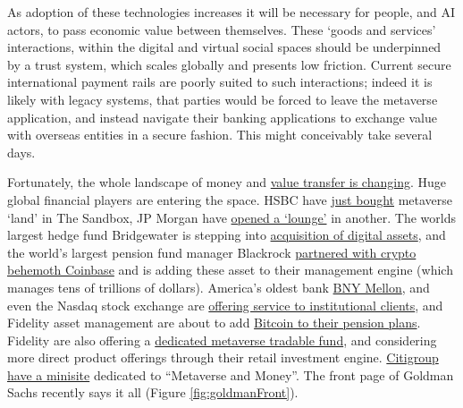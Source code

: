 As adoption of these technologies increases it will be necessary for people, and AI actors, to pass economic value between themselves. These `goods and services' interactions, within the digital and virtual social spaces should be underpinned by a trust system, which scales globally and presents low friction. Current secure international payment rails are poorly suited to such interactions; indeed it is likely with legacy systems, that parties would be forced to leave the metaverse application, and instead navigate their banking applications to exchange value with overseas entities in a secure fashion. This might conceivably take several days.\par 
Fortunately, the whole landscape of money and \href{https://www.omfif.org/futureofpayments2021/}{value transfer is changing}. Huge global financial players are entering the space. HSBC have \href{https://sandboxgame.medium.com/hsbc-to-become-the-first-global-financial-services-provider-to-enter-the-sandbox-c066e4f48163}{just bought} metaverse `land' in The Sandbox, JP Morgan have \href{https://www.forbes.com/sites/ronshevlin/2022/02/16/jpmorgan-opens-a-bank-branch-in-the-metaverse-but-its-not-for-what-you-think-its-for/?sh=2fbd1e90158d}{opened a `lounge'} in another. The worlds largest hedge fund Bridgewater is stepping into \href{https://uk.finance.yahoo.com/news/bitcoin-latest-price-crypto-ray-dalio-bridgewater-investment-fund-ethereum-094946686.html}{acquisition of digital assets}, and the world's largest pension fund manager Blackrock \href{https://blog.coinbase.com/coinbase-selected-by-blackrock-provide-aladdin-clients-access-to-crypto-trading-and-custody-via-b9e7144f313d}{partnered with crypto behemoth Coinbase} and is adding these asset to their management engine (which manages tens of trillions of dollars). America's oldest bank \href{https://www.bnymellon.com/emea/en/about-us/newsroom/press-release/bny-mellon-launches-new-digital-asset-custody-platform-130305.html}{BNY Mellon}, and even the Nasdaq stock exchange are \href{https://www.nasdaq.com/articles/nasdaq-to-launch-institutional-bitcoin-crypto-custody-services\%3A-report}{offering service to institutional clients}, and Fidelity asset management are about to add \href{https://www.wsj.com/articles/fidelity-weighs-bitcoin-trading-on-brokerage-platform-11663008698}{Bitcoin to their pension plans}. Fidelity are also offering a \href{}{dedicated metaverse tradable fund}, and considering more direct product offerings through their retail investment engine. \href{https://www.citivelocity.com/citigps/metaverse-and-money/}{Citigroup have a minisite} dedicated to ``Metaverse and Money''. The front page of Goldman Sachs recently says it all (Figure \ref{fig:goldmanFront}).\par
